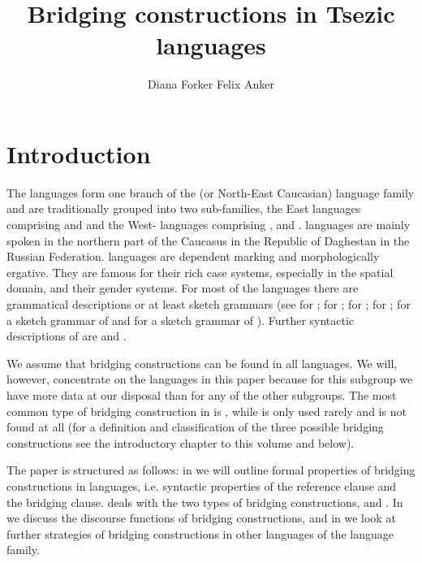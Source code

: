 \documentclass[output=paper]{LSP/langsci}
\author{
   Diana Forker\affiliation{University of Jena}\lastand
   Felix Anker\affiliation{University of Bamberg}
}
\title{Bridging constructions in Tsezic languages}
\begin{document}
\section{Introduction} 
\label{sec:Introduction}
The  languages form one branch of the  (or North-East Caucasian) language family and are traditionally grouped into two sub-families, the East  languages comprising  and  and the West- languages comprising ,  and .  languages are mainly spoken in the northern part of the Caucasus in the Republic of Daghestan in the Russian Federation.  languages are dependent marking and morphologically ergative. They are famous for their rich case systems, especially in the spatial domain, and their gender systems. For most of the  languages there are grammatical descriptions or at least sketch grammars (see \citealt{Forker.2013a} for ; \citealt{Khalilova.2009} for ; \citealt{vandenBerg.1995} for ;  \citealt{Comrie.et.al.2015} for ; \citealt{Kibrik.Testelets.2004} for a sketch grammar of  and \citealt{Alekseev.Radzhabov.2004} for a sketch grammar of ). Further syntactic descriptions of  are \citet{Radjabov.1999} and \citet{Polinsky.InPreparation}.

We assume that bridging constructions can be found in all  languages. We will, however, concentrate on the  languages in this paper because for this subgroup we have more data at our disposal than for any of the other subgroups. The most common type of bridging construction in  is , while  is only used rarely and  is not found at all (for a definition and classification of the three possible bridging constructions see the introductory chapter to this volume and  below).

The paper is structured as follows: in  we will outline formal properties of bridging constructions in  languages, i.e. syntactic properties of the reference clause and the bridging clause.  deals with the two types of bridging constructions,  and . In  we discuss the discourse functions of bridging constructions, and in  we look at further strategies of bridging constructions in other languages of the  language family. 
\end{document}

